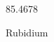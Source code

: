 \documentclass[12pt]{article}
\begin{document}
\hfill{}
\vfill
\begin{center}
  {\fontsize{50}{60}
  }

  85.4678

Rubidium
\end{center}
\vfill
\end{document}
